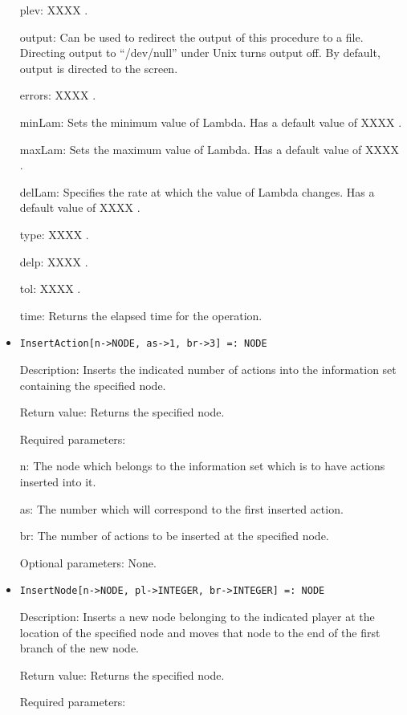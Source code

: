 \begin{itemize}
\bd
\item	
 [ plev:] XXXX .
\item
[ output:] Can be used to redirect the output of this procedure to a
file.  Directing output to ``/dev/null'' under Unix turns output off.
By default, output is directed to the screen.
\item
[ errors:] XXXX .
\item
[ minLam:] Sets the minimum value of Lambda.  Has a default value of
XXXX .
\item
[ maxLam:] Sets the maximum value of Lambda.  Has a default value of XXXX .
\item
[ delLam:] Specifies the rate at which the value of Lambda changes.
Has a default value of XXXX .
\item
[ type:] XXXX .
\item
[ delp:] XXXX .
\item
[ tol:] XXXX .
\item
[ time:] Returns the elapsed time for the operation.
\ed
\ed

\item
\protect \large \begin{verbatim}
InsertAction[n->NODE, as->1, br->3] =: NODE
\end{verbatim}\normalsize

\bd
\item
[Description:] Inserts the indicated number of actions into the 
information set containing the specified node.
\item
[Return value:] Returns the specified node.
\item
[Required parameters:]\hfil\null

\bd
\item
[ n:] The node which belongs to the information set which is to have
actions inserted into it.
\item
[ as:] The number which will correspond to the first inserted action.
\item
[ br:] The number of actions to be inserted at the specified node.
\ed

\item
[Optional parameters:] None.
\ed

\item
\protect \large \begin{verbatim}
InsertNode[n->NODE, pl->INTEGER, br->INTEGER] =: NODE
\end{verbatim}\normalsize

\bd
\item
[Description:] Inserts a new node belonging to the indicated player at 
the location of the specified node and moves that node to the end of 
the first branch of the new node.
\item
[Return value:] Returns the specified node.
\item
[Required parameters:]\hfil\null


\end{itemize}
